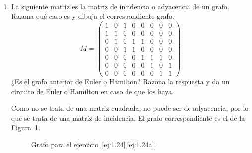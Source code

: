 \begin{ejercicio}\label{ej:1.24}~
    \begin{enumerate}
        \item\label{ej:1.24a}
        La siguiente matriz es la matriz de incidencia o adyacencia de un grafo. Razona qué caso es y dibuja el correspondiente grafo.
        \[
            M=\begin{pmatrix}
                1 & 0 & 1 & 0 & 0 & 0 & 0 & 0 \\
                1 & 1 & 0 & 0 & 0 & 0 & 0 & 0 \\
                0 & 1 & 0 & 1 & 1 & 0 & 0 & 0 \\
                0 & 0 & 1 & 1 & 0 & 0 & 0 & 0 \\
                0 & 0 & 0 & 0 & 1 & 1 & 1 & 0 \\
                0 & 0 & 0 & 0 & 0 & 1 & 0 & 1 \\
                0 & 0 & 0 & 0 & 0 & 0 & 1 & 1
            \end{pmatrix}
        \]
        ¿Es el grafo anterior de Euler o Hamilton? Razona la respuesta y da un circuito de Euler o Hamilton en caso de que los haya.


        Como no se trata de una matriz cuadrada, no puede ser de adyacencia, por lo que se trata de una matriz de incidencia. El grafo correspondiente es el de la Figura~\ref{fig:1.24_1}.
        \begin{figure}
            \centering
            \caption{Grafo para el ejercicio~\ref{ej:1.24}.\ref{ej:1.24a}.}
            \label{fig:1.24_1}
        \end{figure}


\end{enumerate}
\end{ejercicio}
